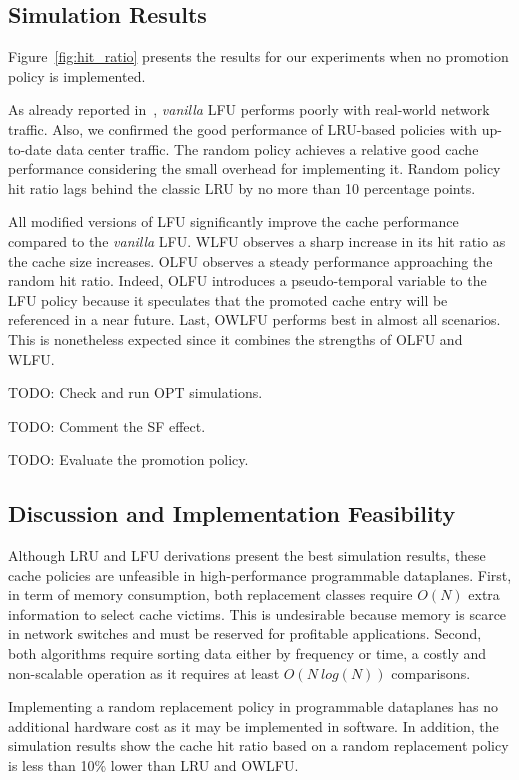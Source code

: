 \subsection{Simulation Results}
Figure~\ref{fig:hit_ratio} presents the results for our experiments when no promotion policy is implemented.

As already reported in~\cite{Kim:09}, \textit{vanilla} LFU performs poorly with real-world network traffic.
Also, we confirmed the good performance of LRU-based policies with up-to-date data center traffic. 
The random policy achieves a relative good cache performance considering the small overhead for implementing it.
Random policy hit ratio lags behind the classic LRU by no more than 10 percentage points.

All modified versions of LFU significantly improve the cache performance compared to the \textit{vanilla} LFU.
WLFU observes a sharp increase in its hit ratio as the cache size increases.
OLFU observes a steady performance approaching the random hit ratio.
Indeed, OLFU introduces a pseudo-temporal variable to the LFU policy because it speculates that the promoted cache entry will be referenced in a near future. 
Last, OWLFU performs best in almost all scenarios.
This is nonetheless expected since it combines the strengths of OLFU and WLFU.

TODO: Check and run OPT simulations.

TODO: Comment the SF effect.

TODO: Evaluate the promotion policy.

\subsection{Discussion and Implementation Feasibility}

Although LRU and LFU derivations present the best simulation results, these cache policies are unfeasible in high-performance programmable dataplanes.
First, in term of memory consumption, both replacement classes require $O(N)$ extra information to select cache victims.
This is undesirable because memory is scarce in network switches and must be reserved for profitable applications.
Second, both algorithms require sorting data either by frequency or time, a costly and non-scalable operation as it requires at least $O(N~log(N))$ comparisons.

Implementing a random replacement policy in programmable dataplanes has no additional hardware cost as it may be implemented in software.
In addition, the simulation results show the cache hit ratio based on a random replacement policy is less than 10\% lower than LRU and OWLFU.
